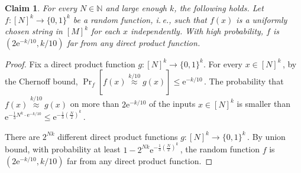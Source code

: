 \documentclass[11pt]{article}
\numberwithin{equation}{section}
\newtheorem{claim}[theorem]{Claim}
\theoremstyle{definition}
\theoremstyle{plain}
\newcommand{\eee}{\mathrm e}
\newcommand{\ie}{i.\,e.}
\newcommand{\Paren}[1]{\left(#1\right)} %
\newcommand{\set}[1]{\{#1\}} %
\newcommand\f{f} %
\newcommand{\g}{g} %
\newcommand\neql[1]{\stackrel{{#1}}{ \approx}} %
\begin{document}
\begin{claim}
	For every $N\in\mathbb{N}$ and large enough $k$, the following holds. Let $\f:[N]^k\rightarrow\{0,1\}^k$ be a random function, \ie, such that $f(x)$ is a uniformly chosen string in $[M]^k$ for each $x$ independently. With high probability, $f$ is $(2\eee^{-k/10},k/10)$ far from any direct product function.
\end{claim}
\begin{proof}
  Fix a direct product function $\g:[N]^k\rightarrow\set{0,1}^k.$ For every $x\in[N]^k$\,, by
the  %
Chernoff bound, %
 $\Pr_f[\f(x)\neql{k/10}\g(x)]\leq \eee^{-k/10}$\,.
    The probability that $\f(x)\neql{k/10}\g(x)$ on more than $2\eee^{-k/10} $ of the inputs $x\in[N]^k$ is smaller than $\eee^{-\frac{1}{3}N^k\cdot \eee^{-k/10}}\leq \eee^{-\frac{1}{3}\Paren{\frac{N}{2}}^k}$\,. 
    
    There are $2^{Nk}$ different direct product functions $\g:[N]^k\rightarrow\{0,1\}^k$\,. By union bound, with probability at least $1-2^{Nk}\eee^{-\frac{1}{3}\Paren{\frac{N}{2}}^k}$\,, the random function $\f$ is $(2\eee^{-k/10},k/10)$ far from any direct product function.
\end{proof}
\end{document}
